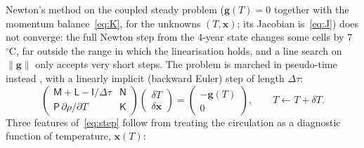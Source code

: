 \documentclass{article}
\begin{document}
Newton's method on the coupled steady problem ($\mathbf{g}(T)=0$ together with the momentum balance~\eqref{eq:K}, for the unknowns $(T,\mathbf{x})$; its Jacobian is~\eqref{eq:J}) does not converge: the full Newton step from the 4-year state changes some cells by 7~$^\circ$C, far outside the range in which the linearisation holds, and a line search on $\lVert\mathbf{g}\rVert$ only accepts very short steps. The problem is marched in pseudo-time instead \citep{kelleykeyes1998}, with a linearly implicit (backward Euler) step of length $\Delta\tau$:
\begin{equation}
\begin{pmatrix}
\mathsf{M} + \mathsf{L} - \mathsf{I}/\Delta\tau & \mathsf{N} \\
\mathsf{P}\,\partial\rho/\partial T & \mathsf{K}
\end{pmatrix}
\begin{pmatrix} \delta T \\ \delta\mathbf{x} \end{pmatrix}
=
\begin{pmatrix} -\mathbf{g}(T) \\ 0 \end{pmatrix},
\qquad T \leftarrow T + \delta T .
\label{eq:step}
\end{equation}
Three features of~\eqref{eq:step} follow from treating the circulation as a diagnostic function of temperature, $\mathbf{x}(T)$:
\end{document}
